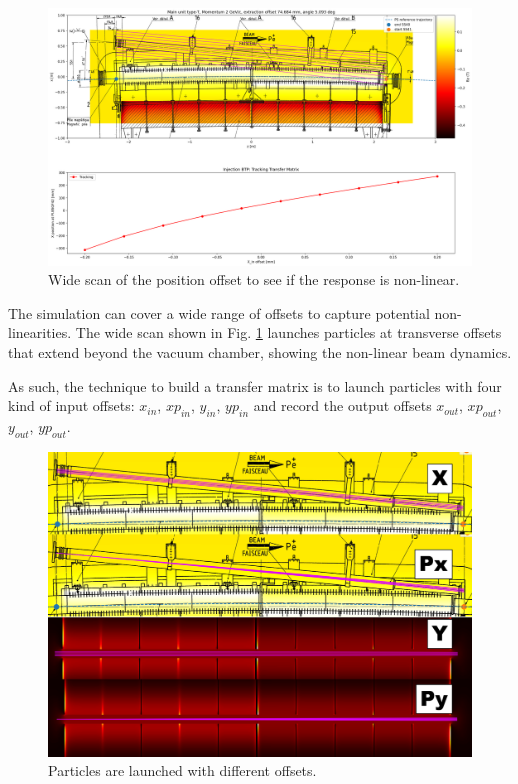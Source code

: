 \begin{figure}[H]
\centering
\includegraphics[width=1.0\textwidth]{02_Simulation/images/injection_transfer_matrix_2.png}
\caption{Wide scan of the position offset to see if the response is non-linear.}
\label{fig:transfer_matrix_2}
\end{figure}


The simulation can cover a wide range of offsets to capture potential non-linearities. The wide scan shown in Fig. \ref{fig:transfer_matrix_2} launches particles at transverse offsets that extend beyond the vacuum chamber, showing the non-linear beam dynamics.

As such, the technique to build a transfer matrix is to launch particles with four kind of input offsets: $x_{in}$, $xp_{in}$, $y_{in}$, $yp_{in}$ and record the output offsets $x_{out}$, $xp_{out}$, $y_{out}$, $yp_{out}$.

\begin{figure}[H]
\centering
\includegraphics[width=1.0\textwidth]{02_Simulation/images/injection_transfer_matrix_3.png}
\caption{Particles are launched with different offsets.}
\label{fig:transfer_matrix_3}
\end{figure}

